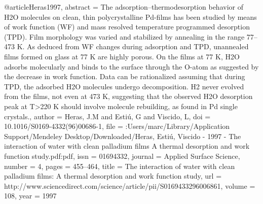 @article{Heras1997,
abstract = {The adsorption–thermodesorption behavior of H2O molecules on clean, thin polycrystalline Pd-films has been studied by means of work function (WF) and mass resolved temperature programmed desorption (TPD). Film morphology was varied and stabilized by annealing in the range 77–473 K. As deduced from WF changes during adsorption and TPD, unannealed films formed on glass at 77 K are highly porous. On the films at 77 K, H2O adsorbs molecularly and binds to the surface through the O-atom as suggested by the decrease in work function. Data can be rationalized assuming that during TPD, the adsorbed H2O molecules undergo decomposition. H2 never evolved from the films, not even at 473 K, suggesting that the observed H2O desorption peak at T{\textgreater}220 K should involve molecule rebuilding, as found in Pd single crystals.},
author = {Heras, J.M and Esti{\'{u}}, G and Viscido, L},
doi = {10.1016/S0169-4332(96)00686-1},
file = {:Users/marc/Library/Application Support/Mendeley Desktop/Downloaded/Heras, Esti{\'{u}}, Viscido - 1997 - The interaction of water with clean palladium films A thermal desorption and work function study.pdf:pdf},
issn = {01694332},
journal = {Applied Surface Science},
number = {4},
pages = {455--464},
title = {{The interaction of water with clean palladium films: A thermal desorption and work function study}},
url = {http://www.sciencedirect.com/science/article/pii/S0169433296006861},
volume = {108},
year = {1997}
}
